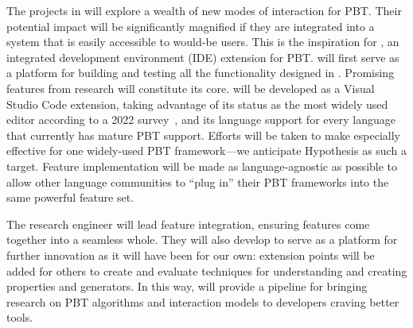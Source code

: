 The projects in  will explore a wealth of new modes of interaction
for PBT. Their potential impact will be significantly magnified if they are
integrated into a system
that is easily accessible to would-be users. This is the inspiration for
\tyche{}, an integrated development environment (IDE) extension for PBT.
\tyche{} will first serve as a platform for building and testing all the functionality designed in . Promising features from research will constitute its core.
\tyche{} will be developed as a Visual Studio Code extension, taking advantage of its status as the most widely used editor according to a 2022 survey~\cite{noauthor_stack_nodate}, and its language support for every language that currently has mature PBT support.
Efforts will be taken to make \tyche{} especially effective for one widely-used PBT framework---we anticipate Hypothesis as such a target. Feature implementation will be made as language-agnostic as possible to allow other language communities to ``plug in'' their PBT frameworks into the same powerful feature set.

The research engineer will lead feature integration, ensuring features come together into a
seamless whole. They will also develop \tyche{} to serve as a platform for
further innovation as it will have been for our own: extension points will be added
for others to create and evaluate techniques for understanding and creating properties and generators.
In this way, \tyche{} will provide a pipeline for bringing research on
PBT algorithms and interaction models to developers craving better tools.

